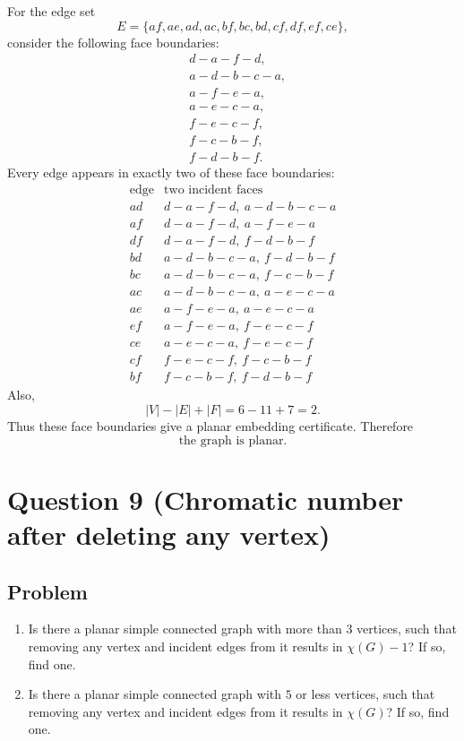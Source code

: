\documentclass[12pt]{article}
\begin{document}
For the edge set
\[
E=\{af,ae,ad,ac,bf,bc,bd,cf,df,ef,ce\},
\]
consider the following face boundaries:
\[
\begin{aligned}
&d-a-f-d,\\
&a-d-b-c-a,\\
&a-f-e-a,\\
&a-e-c-a,\\
&f-e-c-f,\\
&f-c-b-f,\\
&f-d-b-f.
\end{aligned}
\]
Every edge appears in exactly two of these face boundaries:
\[
\begin{array}{c|c}
\text{edge} & \text{two incident faces}\\ \hline
ad & d-a-f-d,\ a-d-b-c-a\\
af & d-a-f-d,\ a-f-e-a\\
df & d-a-f-d,\ f-d-b-f\\
bd & a-d-b-c-a,\ f-d-b-f\\
bc & a-d-b-c-a,\ f-c-b-f\\
ac & a-d-b-c-a,\ a-e-c-a\\
ae & a-f-e-a,\ a-e-c-a\\
ef & a-f-e-a,\ f-e-c-f\\
ce & a-e-c-a,\ f-e-c-f\\
cf & f-e-c-f,\ f-c-b-f\\
bf & f-c-b-f,\ f-d-b-f
\end{array}
\]
Also,
\[
|V|-|E|+|F|=6-11+7=2.
\]
Thus these face boundaries give a planar embedding certificate. Therefore
\[
\boxed{\text{the graph is planar.}}
\]

\newpage
\section{Question 9 (Chromatic number after deleting any vertex)}

\subsection{Problem}
\begin{enumerate}[label=(\alph*)]
  \item Is there a planar simple connected graph with more than $3$ vertices, such that removing any vertex and incident edges from it results in $\chi(G)-1$? If so, find one.
  \item Is there a planar simple connected graph with $5$ or less vertices, such that removing any vertex and incident edges from it results in $\chi(G)$? If so, find one.
\end{enumerate}
\end{document}
